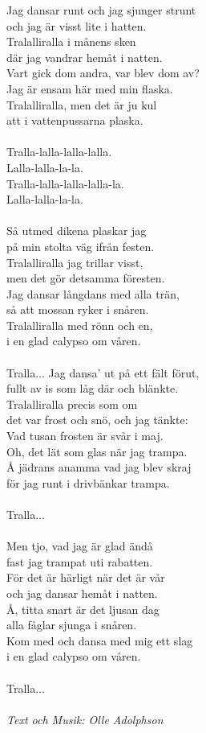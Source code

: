 \vspace{10pt}
Jag dansar runt och jag sjunger strunt\\
och jag är visst lite i hatten.\\
Tralalliralla i månens sken\\
där jag vandrar hemåt i natten.\\
Vart gick dom andra, var blev dom av?\\
Jag är ensam här med min flaska.\\
Tralalliralla, men det är ju kul\\
att i vattenpussarna plaska.\\
\\
Tralla-lalla-lalla-lalla.\\
Lalla-lalla-la-la.\\
Tralla-lalla-lalla-lalla-la.\\
Lalla-lalla-la-la.\\
\\
Så utmed dikena plaskar jag\\
på min stolta väg ifrån festen.\\
Tralalliralla jag trillar visst,\\
men det gör detsamma föresten.\\
Jag dansar långdans med alla trän,\\
så att mossan ryker i snåren.\\
Tralalliralla med rönn och en,\\
i en glad calypso om våren.\\
\\
Tralla...
\newpage
Jag dansa' ut på ett fält förut,\\
fullt av is som låg där och blänkte.\\
Tralalliralla precis som om\\
det var frost och snö, och jag tänkte:\\
Vad tusan frosten är svår i maj.\\
Oh, det lät som glas när jag trampa.\\
Å jädrans anamma vad jag blev skraj\\
för jag runt i drivbänkar trampa.\\
\\
Tralla...\\
\\
Men tjo, vad jag är glad ändå\\
fast jag trampat uti rabatten.\\
För det är härligt när det är vår\\
och jag dansar hemåt i natten.\\
Å, titta snart är det ljusan dag\\
alla fåglar sjunga i snåren.\\
Kom med och dansa med mig ett slag\\
i en glad calypso om våren.\\
\\
Tralla...\\
\\
{\footnotesize\textit{Text och Musik: Olle Adolphson}}
